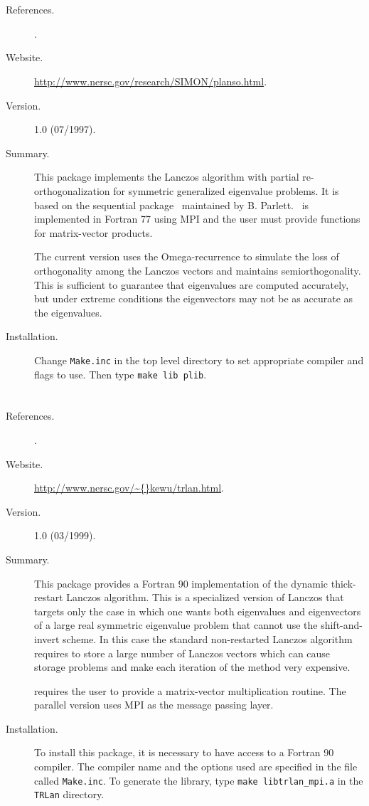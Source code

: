 \section*{\underline{\planso}}
	\begin{description}
	\item[References.]\citep{Wu:1997:PLM}.
	\item[Website.] \url{http://www.nersc.gov/research/SIMON/planso.html}.
	\item[Version.] 1.0 (07/1997).
	\item[Summary.] This package implements the Lanczos algorithm with partial re-orthogonalization for symmetric generalized eigenvalue problems. It is based on the sequential package \lanso\ maintained by B. Parlett. \planso\ is implemented in Fortran 77 using MPI and the user must provide functions for matrix-vector products.

The current version uses the Omega-recurrence to simulate the loss of orthogonality among the Lanczos vectors and maintains semiorthogonality.  This is sufficient to guarantee that eigenvalues are computed accurately, but under extreme conditions the eigenvectors may not be as accurate as the eigenvalues.
	\item[Installation.] Change \texttt{Make.inc} in the top level directory to set appropriate compiler and flags to use. Then type \texttt{make lib plib}.
	\end{description}

\section*{\underline{\trlan}}
	\begin{description}
	\item[References.]\citep{Wu:2001:TLM}.
	\item[Website.] \url{http://www.nersc.gov/\~{}kewu/trlan.html}.
	\item[Version.] 1.0 (03/1999).
	\item[Summary.] This package provides a Fortran 90 implementation of the dynamic thick-restart Lanczos algorithm. This is a specialized version of Lanczos that targets only the case in which one wants both eigenvalues and eigenvectors of a large real symmetric eigenvalue problem that cannot use the shift-and-invert scheme. In this case the standard non-restarted Lanczos algorithm requires to store a large number of Lanczos vectors which can cause storage problems and make each iteration of the method very expensive.

	\trlan{} requires the user to provide a matrix-vector multiplication routine. The parallel version uses MPI as the message passing layer. 
	\item[Installation.] To install this package, it is necessary to have access to a Fortran 90 compiler. The compiler name and the options used are specified in the file called \texttt{Make.inc}. To generate the library, type \texttt{make libtrlan\_mpi.a} in the \texttt{TRLan} directory.
	\end{description}

